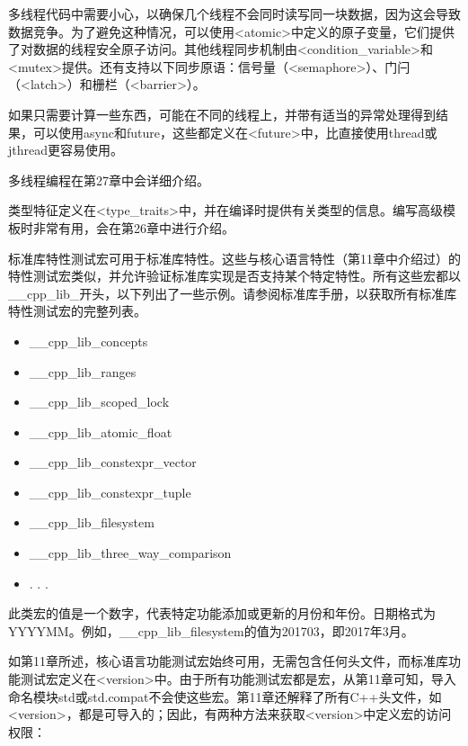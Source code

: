 多线程代码中需要小心，以确保几个线程不会同时读写同一块数据，因为这会导致数据竞争。为了避免这种情况，可以使用<atomic>中定义的原子变量，它们提供了对数据的线程安全原子访问。其他线程同步机制由<condition\_variable>和<mutex>提供。还有支持以下同步原语：信号量（<semaphore>）、门闩（<latch>）和栅栏（<barrier>）。

如果只需要计算一些东西，可能在不同的线程上，并带有适当的异常处理得到结果，可以使用async和future，这些都定义在<future>中，比直接使用thread或jthread更容易使用。

多线程编程在第27章中会详细介绍。


类型特征定义在<type\_traits>中，并在编译时提供有关类型的信息。编写高级模板时非常有用，会在第26章中进行介绍。


标准库特性测试宏可用于标准库特性。这些与核心语言特性（第11章中介绍过）的特性测试宏类似，并允许验证标准库实现是否支持某个特定特性。所有这些宏都以\_\_cpp\_lib\_开头，以下列出了一些示例。请参阅标准库手册，以获取所有标准库特性测试宏的完整列表。

\begin{itemize}
\item
\_\_cpp\_lib\_concepts

\item
\_\_cpp\_lib\_ranges

\item
\_\_cpp\_lib\_scoped\_lock

\item
\_\_cpp\_lib\_atomic\_float

\item
\_\_cpp\_lib\_constexpr\_vector

\item
\_\_cpp\_lib\_constexpr\_tuple

\item
\_\_cpp\_lib\_filesystem

\item
\_\_cpp\_lib\_three\_way\_comparison

\item
. . .
\end{itemize}

此类宏的值是一个数字，代表特定功能添加或更新的月份和年份。日期格式为YYYYMM。例如，\_\_cpp\_lib\_filesystem的值为201703，即2017年3月。

如第11章所述，核心语言功能测试宏始终可用，无需包含任何头文件，而标准库功能测试宏定义在<version>中。由于所有功能测试宏都是宏，从第11章可知，导入命名模块std或std.compat不会使这些宏。第11章还解释了所有C++头文件，如<version>，都是可导入的；因此，有两种方法来获取<version>中定义宏的访问权限：

